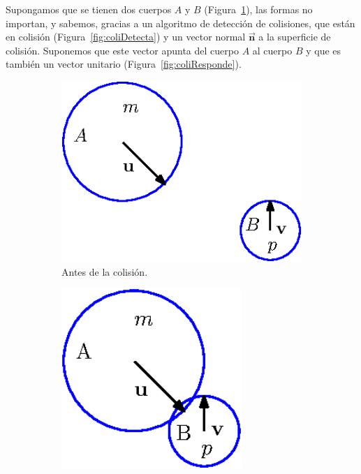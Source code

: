 Supongamos que se tienen dos cuerpos $A$ y $B$ (Figura~\ref{fig:coliAntes}), las formas no importan, y sabemos, gracias a un algoritmo de detección de colisiones, que están en colisión (Figura~\ref{fig:coliDetecta}) y un vector normal $\vec{\textbf{n}}$ a la superficie de colisión.
Suponemos que este vector apunta del cuerpo $A$ al cuerpo $B$ y que es también un vector unitario (Figura~\ref{fig:coliResponde}).

\begin{figure}
 \centering
  \begin{subfigure}[b]{0.32\textwidth}
    \includegraphics[width=1.2\textwidth]{Img/02/colisionesAntes}
    \caption{Antes de la colisión.}
    \label{fig:coliAntes}
  \end{subfigure}
  \hspace{2cm}
  \begin{subfigure}[b]{0.32\textwidth}
    \includegraphics[width=0.75\textwidth]{Img/02/colisionesDetecta}

\end{subfigure}
\end{figure}
